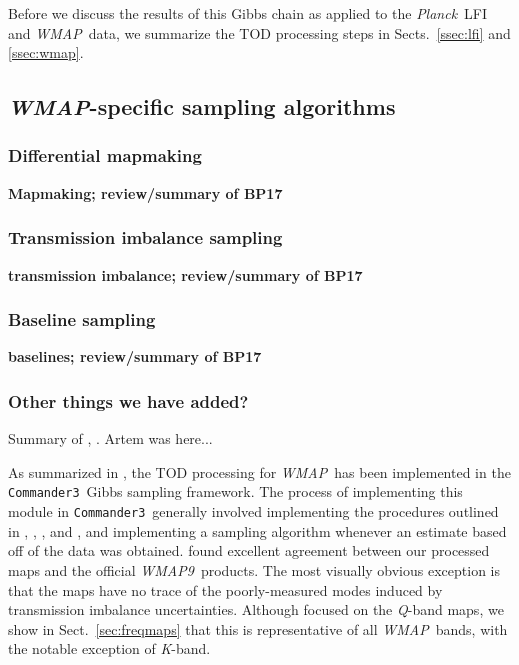 \documentclass[twocolumn]{../../common/aa}
\def\WMAP{\emph{WMAP}}
\def\WMAPnine{\emph{WMAP9}}
\def\wmap{\emph{WMAP}}
\def\planck{\emph{Planck}}
\def\Planck{\emph{Planck}}
\def\commanderthree{\texttt{Commander3}}
\newcommand{\K}[0]{\textit K}
\newcommand{\Q}[0]{\textit Q}
\begin{document}
Before we discuss the results of this Gibbs chain as applied to the \Planck\ LFI and \WMAP\ data, we summarize the TOD processing steps in Sects.~\ref{ssec:lfi} and \ref{ssec:wmap}.


\subsection{\WMAP-specific sampling algorithms}


\subsubsection{Differential mapmaking}
\label{ssec:mapmaking}

\textbf{Mapmaking; review/summary of BP17}


\subsubsection{Transmission imbalance sampling}
\label{ssec:mapmaking}

\textbf{transmission imbalance; review/summary of BP17}

\subsubsection{Baseline sampling}
\label{ssec:baseline}

\textbf{baselines; review/summary of BP17}

\subsubsection{Other things we have added?}
\label{ssec:baseline}




Summary of \citet{bp01}, \citet{bp10}.
Artem was here...


As summarized in \citet{bp17}, the TOD processing for \WMAP\ has been
implemented in the \commanderthree\ Gibbs sampling framework.  The process of
implementing this module in \commanderthree\ generally involved implementing
the procedures outlined in \citet{jarosik2003a}, \citet{hinshaw2003a},
\citet{jarosik2007}, and \citet{wmapexsupp}, and implementing a sampling
algorithm whenever an estimate based off of the data was obtained. \citet{bp17}
found excellent agreement between our processed maps and the official
\WMAPnine\ products. The most visually obvious exception is that the
\citet{bp17} maps have no trace of the poorly-measured modes induced by
transmission imbalance uncertainties. Although \citet{bp17} focused on the
\Q-band maps, we show in Sect.~\ref{sec:freqmaps} that this is representative
of all \WMAP\ bands, with the notable exception of \K-band.
\end{document}
